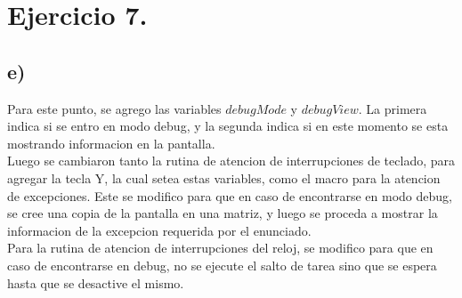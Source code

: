 \section{Ejercicio 7.}

\subsection*{e)}

\noindent Para este punto, se agrego las variables $debugMode$ y $debugView$. La primera indica si se entro en modo debug, y la segunda indica si en este momento se esta mostrando informacion en la pantalla. \\

\noindent Luego se cambiaron tanto la rutina de atencion de interrupciones de teclado, para agregar la tecla Y, la cual setea estas variables, como el macro para la atencion de excepciones. Este se modifico para que en caso de encontrarse en modo debug, se cree una copia de la pantalla en una matriz, y luego se proceda a mostrar la informacion de la excepcion requerida por el enunciado. \\

\noindent Para la rutina de atencion de interrupciones del reloj, se modifico para que en caso de encontrarse en debug, no se ejecute el salto de tarea sino que se espera hasta que se desactive el mismo.
